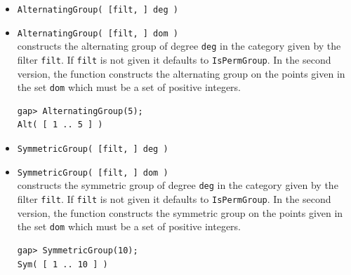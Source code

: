 \begin{itemize}
\item {\tt AlternatingGroup( [filt, ] deg )}
\item {\tt AlternatingGroup( [filt, ] dom )}\\[2pt] 
constructs the alternating group of degree {\tt deg} in the category given by the
filter {\tt filt}. 
If {\tt filt} is not given it defaults to {\tt IsPermGroup}.
In the second version, the function constructs the alternating group on the points
given in the set {\tt dom} which must be a set of positive integers.
{\codesize
\begin{verbatim}
gap> AlternatingGroup(5);
Alt( [ 1 .. 5 ] )
\end{verbatim}}
\item {\tt SymmetricGroup( [filt, ] deg )}
\item {\tt SymmetricGroup( [filt, ] dom )}\\[2pt] 
constructs the symmetric group of degree {\tt deg} in the category given by the
filter {\tt filt}. 
If {\tt filt} is not given it defaults to {\tt IsPermGroup}.
In the second version, the function constructs the symmetric group on the points
given in the set {\tt dom} which must be a set of positive integers.
{\codesize
\begin{verbatim}
gap> SymmetricGroup(10);
Sym( [ 1 .. 10 ] )
\end{verbatim}}
\end{itemize}

\newpage

